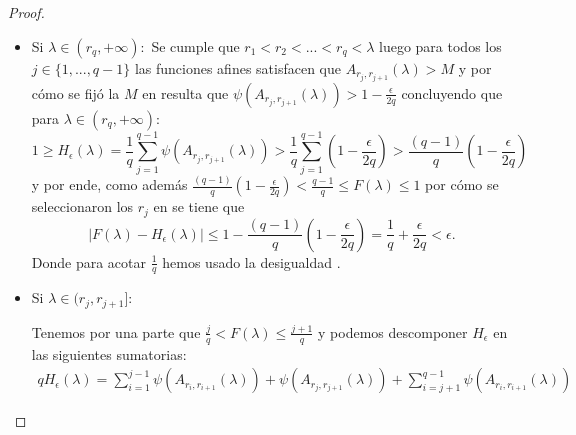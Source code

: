 \begin{proof}
\begin{itemize}
        \item Si $\lambda \in (r_q, +\infty):$
        Se cumple que $r_1 < r_2 <...< r_q <\lambda$ luego  
        para todos los $j \in \{1, ..., q-1\}$ las funciones afines satisfacen que  
        $A_{r_j, r_{j+1}}(\lambda) > M$ y por cómo se fijó la $M$ en 
        resulta que  $\psi( A_{r_j, r_{j+1}}(\lambda)) > 1-\frac{\epsilon}{2q}$ concluyendo que 
        para $\lambda \in (r_q,+\infty):$
        \begin{equation}
            1 \geq
            H_\epsilon(\lambda) = \frac{1}{q} \sum^{q-1}_{j=1} \psi( A_{r_j, r_{j+1}}(\lambda)) 
            >
                \frac{1}{q} \sum^{q-1}_{j=1}  \left(1-\frac{\epsilon}{2q} \right)
            >
            \frac{(q-1)}{q}  \left(1-\frac{\epsilon}{2q} \right)   
        \end{equation}
        y por ende, como además $\frac{(q-1)}{q}  \left(1-\frac{\epsilon}{2q} \right) <  \frac{q-1}{q} \leq F(\lambda) \leq 1$ por cómo se seleccionaron los $r_j$ en 
         se tiene que 
        \begin{equation}
            | F(\lambda) - H_{\epsilon}(\lambda) | 
            \leq
            1 - \frac{(q-1)}{q}  \left(1-\frac{\epsilon}{2q} \right)
            = \frac{1}{q} + \frac{\epsilon}{2q}
            < \epsilon.
        \end{equation}
        Donde para acotar $\frac{1}{q}$ hemos usado la desigualdad .

        \item Si $\lambda \in (r_{j},r_{j+1}]:$
        
        Tenemos por una parte que $\frac{j}{q} < F(\lambda) \leq \frac{j+1}{q}$ y 
        podemos descomponer $H_\epsilon$ en las siguientes sumatorias: 
        \begin{equation}
            \begin{split}
                q H_\epsilon(\lambda) 
                = 
                 \sum^{j-1}_{i=1} \psi( A_{r_i, r_{i+1}}(\lambda))
                + 
                \psi( A_{r_j, r_{j+1}}(\lambda))
                + 
                \sum^{q-1}_{i=j+1} \psi( A_{r_i, r_{i+1}}(\lambda))
            \end{split}
        \end{equation}


\end{itemize}
\end{proof}
